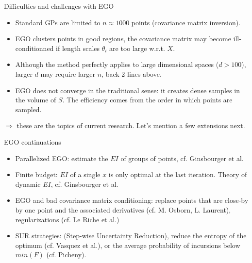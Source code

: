 \documentclass{beamer}
\begin{document}
\begin{frame}{}
\begin{exampleblock}{Difficulties and challenges with EGO}
\begin{itemize}
\item Standard GPs are limited to $n \approx 1000$ points (covariance matrix inversion).
\item EGO clusters points in good regions, the covariance matrix may become ill-conditionned 
if length scales $\theta_i$ are too large w.r.t. $X$.
\item Although the method perfectly applies to large dimensional spaces ($d>100$), larger $d$ 
may require larger $n$, back 2 lines above.
\item EGO does not converge in the traditional sense: it creates dense samples in the volume of $S$. 
The efficiency comes from the order in which points are sampled.
\end{itemize}
$\Rightarrow$ these are the topics of current research. Let's mention a few extensions next.
\end{exampleblock}
\end{frame}

\begin{frame}{}
\begin{exampleblock}{EGO continuations}
\begin{itemize}
\item Parallelized EGO: estimate the $EI$ of groups of points, cf. Ginsbourger et al. 
\item Finite budget: $EI$ of a single $x$ is only optimal at the last iteration. Theory of dynamic $EI$, cf. Ginsbourger et al.
\item EGO and bad covariance matrix conditioning: replace points that are close-by by one point and the associated derivatives (cf. M. Osborn, L. Laurent), regularizations (cf. Le Riche et al.)
\item SUR strategies: (Step-wise Uncertainty Reduction), reduce the entropy of the optimum (cf. Vasquez et al.), or the average probability of incursions below $min(F)$ (cf. Picheny).
\end{itemize}
\end{exampleblock}
\end{frame}
\end{document}
